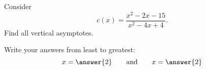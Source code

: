 \documentclass{ximera}
\author{Bart Snapp}
\begin{document}
\begin{exercise}
Consider 
\[c(x) = \frac{x^2-2 x-15}{x^2-4 x+4}.
\]
Find all vertical asymptotes.
\begin{prompt}
\begin{multipleChoice}
\end{multipleChoice}
\begin{exercise}Write your answers from least to greatest:
\[
x=\answer{2}\qquad\text{and}\qquad x=\answer{2}
\]
\end{exercise}
\end{prompt}
\end{exercise}
\end{document}
